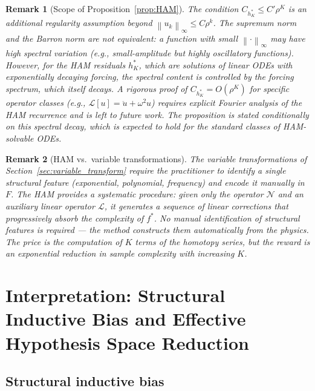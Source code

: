 \documentclass[12pt]{article}
\newtheorem{remark}{Remark}
\newcommand{\norm}[1]{\left\|#1\right\|}
\begin{document}
\begin{remark}[Scope of Proposition~\ref{prop:HAM}]
\label{rem:ham_scope}
The condition $C_{h^*_K} \le C'\rho^K$ is an additional regularity
assumption beyond $\norm{u_k}_\infty \le C\rho^k$.
The supremum norm and the Barron norm are not equivalent: a function
with small $\norm{\cdot}_\infty$ may have high spectral variation
(e.g., small-amplitude but highly oscillatory functions).
However, for the HAM residuals $h^*_K$, which are solutions of
\emph{linear} ODEs with exponentially decaying forcing, the spectral
content is controlled by the forcing spectrum, which itself decays.
A rigorous proof of $C_{h^*_K} = O(\rho^K)$ for specific operator
classes (e.g., $\mathcal{L}[u] = \ddot{u} + \omega^2 u$) requires
explicit Fourier analysis of the HAM recurrence and is left to
future work.
The proposition is stated conditionally on this spectral decay, which
is expected to hold for the standard classes of HAM-solvable ODEs.
\end{remark}

\begin{remark}[HAM vs.\ variable transformations]
\label{rem:ham_vs_vt}
The variable transformations of Section~\ref{sec:variable_transform}
require the practitioner to identify a single structural feature
(exponential, polynomial, frequency) and encode it manually in $F$.
The HAM provides a \emph{systematic} procedure: given only the
operator $\mathcal{N}$ and an auxiliary linear operator
$\mathcal{L}$, it generates a sequence of linear corrections that
progressively absorb the complexity of $f^*$.
No manual identification of structural features is required ---
the method constructs them automatically from the physics.
The price is the computation of $K$ terms of the homotopy series,
but the reward is an exponential reduction in sample complexity with
increasing $K$.
\end{remark}

\section{Interpretation: Structural Inductive Bias and Effective
  Hypothesis Space Reduction}
\label{sec:bias}

\subsection{Structural inductive bias}
\end{document}

